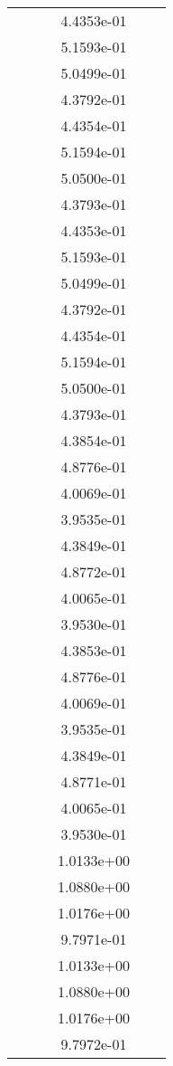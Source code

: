 \begin{xltabular}{\textwidth}{r|rS[table-format=1.3e+2]S[table-format=1.4e+2]S[table-format=1.4e+2]S[table-format=-1.5]}
&  &  & 4.4353e-01 & & \\
&  &  & 5.1593e-01 & & \\
&  &  & 5.0499e-01 & & \\
&  &  & 4.3792e-01 & & \\
&  &  & 4.4354e-01 & & \\
&  &  & 5.1594e-01 & & \\
&  &  & 5.0500e-01 & & \\
&  &  & 4.3793e-01 & & \\
&  &  & 4.4353e-01 & & \\
&  &  & 5.1593e-01 & & \\
&  &  & 5.0499e-01 & & \\
&  &  & 4.3792e-01 & & \\
&  &  & 4.4354e-01 & & \\
&  &  & 5.1594e-01 & & \\
&  &  & 5.0500e-01 & & \\
&  &  & 4.3793e-01 & & \\
&  &  & 4.3854e-01 & & \\
&  &  & 4.8776e-01 & & \\
&  &  & 4.0069e-01 & & \\
&  &  & 3.9535e-01 & & \\
&  &  & 4.3849e-01 & & \\
&  &  & 4.8772e-01 & & \\
&  &  & 4.0065e-01 & & \\
&  &  & 3.9530e-01 & & \\
&  &  & 4.3853e-01 & & \\
&  &  & 4.8776e-01 & & \\
&  &  & 4.0069e-01 & & \\
&  &  & 3.9535e-01 & & \\
&  &  & 4.3849e-01 & & \\
&  &  & 4.8771e-01 & & \\
&  &  & 4.0065e-01 & & \\
&  &  & 3.9530e-01 & & \\
&  &  & 1.0133e+00 & & \\
&  &  & 1.0880e+00 & & \\
&  &  & 1.0176e+00 & & \\
&  &  & 9.7971e-01 & & \\
&  &  & 1.0133e+00 & & \\
&  &  & 1.0880e+00 & & \\
&  &  & 1.0176e+00 & & \\
&  &  & 9.7972e-01 & & \\

\end{xltabular}
